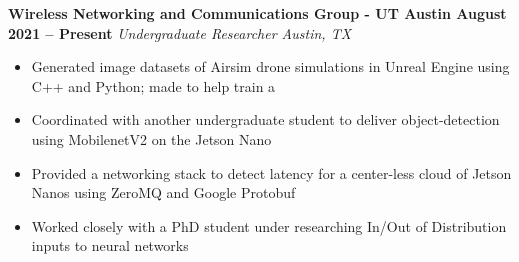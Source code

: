 \documentclass[../main.tex]{subfiles}
\begin{document}
%
\noindent\textbf{{\fontsize{\textFontSize}{\textFontBox}\selectfont Wireless Networking and Communications Group - UT Austin \hfill August 2021 – Present}}
\vspace{\jobHeaderDist}\newline
%
{\fontsize{\textFontSize}{\textFontBox}\selectfont\emph{Undergraduate Researcher \hfill Austin, TX \hspace{0 cm}}}\vspace{\listHeight}\newline
%
%
%
%
%
\begin{itemize}
  \setlength{\itemindent}{-6mm}
  \vspace{\listItemDistTwo}\item {\fontsize{\textFontSize}{\textFontBox}\selectfont Generated image datasets of Airsim drone simulations in Unreal Engine using C++ and Python; made to help train a }
  \vspace{\listItemDistTwo}\item {\fontsize{\textFontSize}{\textFontBox}\selectfont Coordinated with another undergraduate student to deliver object-detection using MobilenetV2 on the Jetson Nano }
  \vspace{\listItemDistTwo}\item {\fontsize{\textFontSize}{\textFontBox}\selectfont Provided a networking stack to detect latency for a center-less cloud of Jetson Nanos using ZeroMQ and Google Protobuf }
  \vspace{-9mm}\item {\fontsize{\textFontSize}{\textFontBox}\selectfont Worked closely with a PhD student under researching In/Out of Distribution inputs to neural networks }
\end{itemize}
%
%
\end{document}
